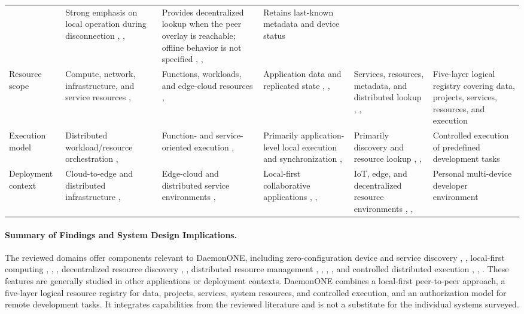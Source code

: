 \documentclass[10pt,twocolumn]{article}
\newcommand{\resourceRegistryName}{five-layer logical resource registry}
\begin{document}
\begin{table}[!t]
\begin{tabularx}{0.98\textwidth}{>{\raggedright\arraybackslash}p{}*{5}{>{\raggedright\arraybackslash}X}}
		& Strong emphasis on local operation during disconnection \cite{ref2}, \cite{ref3}, \cite{ref9}
		& Provides decentralized lookup when the peer overlay is reachable; offline behavior is not specified \cite{ref16}, \cite{ref20}, \cite{ref22}
		& Retains last-known metadata and device status \\
		\addlinespace
		Resource scope
		& Compute, network, infrastructure, and service resources \cite{ref4}, \cite{ref21}
		& Functions, workloads, and edge-cloud resources \cite{ref11}, \cite{ref25}
		& Application data and replicated state \cite{ref2}, \cite{ref3}, \cite{ref9}
		& Services, resources, metadata, and distributed lookup \cite{ref16}, \cite{ref20}, \cite{ref22}
		& Five-layer logical registry covering data, projects, services, resources, and execution \\
		\addlinespace
		Execution model
		& Distributed workload/resource orchestration \cite{ref4}, \cite{ref21}
		& Function- and service-oriented execution \cite{ref11}, \cite{ref25}
		& Primarily application-level local execution and synchronization \cite{ref2}, \cite{ref3}
		& Primarily discovery and resource lookup \cite{ref16}, \cite{ref20}, \cite{ref22}
		& Controlled execution of predefined development tasks \\
		\addlinespace
		Deployment context
		& Cloud-to-edge and distributed infrastructure \cite{ref4}, \cite{ref21}
		& Edge-cloud and distributed service environments \cite{ref11}, \cite{ref25}
		& Local-first collaborative applications \cite{ref2}, \cite{ref3}, \cite{ref9}
		& IoT, edge, and decentralized resource environments \cite{ref16}, \cite{ref20}, \cite{ref22}
		& Personal multi-device developer environment \\
		\bottomrule
	\end{tabularx}
\end{table}
\paragraph{Summary of Findings and System Design Implications.}\label{subsec:implications}
The reviewed domains offer components relevant to DaemonONE, including zero-configuration device and service discovery \cite{ref6}, \cite{ref7}, local-first computing \cite{ref2}, \cite{ref3}, \cite{ref9}, decentralized resource discovery \cite{ref16}, \cite{ref22}, distributed resource management \cite{ref5}, \cite{ref14}, \cite{ref15}, \cite{ref23}, and controlled distributed execution \cite{ref11}, \cite{ref24}, \cite{ref25}. These features are generally studied in other applications or deployment contexts. DaemonONE combines a local-first peer-to-peer approach, a \resourceRegistryName{} for data, projects, services, system resources, and controlled execution, and an authorization model for remote development tasks. It integrates capabilities from the reviewed literature and is not a substitute for the individual systems surveyed.
\end{document}
